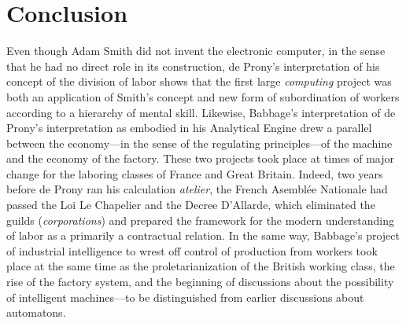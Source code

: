 \documentclass[version=last,draft=false,paper=A4,portrait,twoside=true,twocolumn=false,headinclude=false,footinclude=false,mpinclude=true,fontsize=12,BCOR=20mm,DIV=calc,pagesize=auto,open=right,chapterprefix=true,numbers=autoendperiod,headsepline=false,headings=twolinechapter,parskip=false]{scrbook}
\begin{document}
\chapter{Conclusion}
\label{sec:orgfd0fb0d}

Even though Adam Smith did not invent the electronic computer, in the sense
that he had no direct role in its construction, de Prony's interpretation
of his concept of the division of labor shows that the first large
\emph{computing} project was both an application of Smith's concept and new form
of subordination of workers according to a hierarchy of mental skill.
Likewise, Babbage's interpretation of de Prony's interpretation as embodied
in his Analytical Engine drew a parallel between the economy---in the sense
of the regulating principles---of the machine and the economy of the
factory. These two projects took place at times of major change for the
laboring classes of France and Great Britain. Indeed, two years before de
Prony ran his calculation \emph{atelier}, the French Asemblée Nationale had passed
the Loi Le Chapelier and the Decree D'Allarde, which eliminated the guilds
(\emph{corporations}) and prepared the framework for the modern understanding of
labor as a primarily a contractual relation. In the same way, Babbage's
project of industrial intelligence to wrest off control of production from
workers took place at the same time as the proletarianization of the
British working class, the rise of the factory system, and the beginning of
discussions about the possibility of intelligent machines---to be
distinguished from earlier discussions about automatons. 
\end{document}
